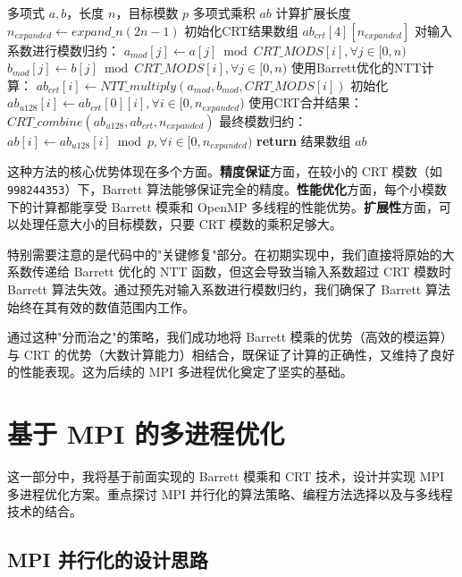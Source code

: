 \documentclass[a4paper]{article}
\begin{document}
\begin{algorithm}[htbp]
\caption{基于CRT的多项式乘法MPI实现}
\label{alg:crt_mpi}
\begin{algorithmic}[1]
\Require 多项式 $a, b$，长度 $n$，目标模数 $p$
\Ensure 多项式乘积 $ab$
\State 计算扩展长度 $n_{expanded} \gets expand\_n(2n-1)$
\State 初始化CRT结果数组 $ab_{crt}[4][n_{expanded}]$
    \State 对输入系数进行模数归约：
    \State $a_{mod}[j] \gets a[j] \bmod CRT\_MODS[i], \forall j \in [0,n)$
    \State $b_{mod}[j] \gets b[j] \bmod CRT\_MODS[i], \forall j \in [0,n)$
    \State 使用Barrett优化的NTT计算：
    \State $ab_{crt}[i] \gets NTT\_multiply(a_{mod}, b_{mod}, CRT\_MODS[i])$
\EndFor
\State 初始化 $ab_{u128}[i] \gets ab_{crt}[0][i], \forall i \in [0,n_{expanded})$
\State 使用CRT合并结果：$CRT\_combine(ab_{u128}, ab_{crt}, n_{expanded})$
\State 最终模数归约：$ab[i] \gets ab_{u128}[i] \bmod p, \forall i \in [0,n_{expanded})$
\State \textbf{return} 结果数组 $ab$
\end{algorithmic}
\end{algorithm}

这种方法的核心优势体现在多个方面。\textbf{精度保证}方面，在较小的 CRT 模数（如\texttt{998244353}）下，Barrett 算法能够保证完全的精度。\textbf{性能优化}方面，每个小模数下的计算都能享受 Barrett 模乘和 OpenMP 多线程的性能优势。\textbf{扩展性}方面，可以处理任意大小的目标模数，只要 CRT 模数的乘积足够大。

特别需要注意的是代码中的"关键修复"部分。在初期实现中，我们直接将原始的大系数传递给 Barrett 优化的 NTT 函数，但这会导致当输入系数超过 CRT 模数时 Barrett 算法失效。通过预先对输入系数进行模数归约，我们确保了 Barrett 算法始终在其有效的数值范围内工作。

通过这种"分而治之"的策略，我们成功地将 Barrett 模乘的优势（高效的模运算）与 CRT 的优势（大数计算能力）相结合，既保证了计算的正确性，又维持了良好的性能表现。这为后续的 MPI 多进程优化奠定了坚实的基础。

\section{基于 MPI 的多进程优化}

这一部分中，我将基于前面实现的 Barrett 模乘和 CRT 技术，设计并实现 MPI 多进程优化方案。重点探讨 MPI 并行化的算法策略、编程方法选择以及与多线程技术的结合。

\subsection{MPI 并行化的设计思路}
\end{document}
